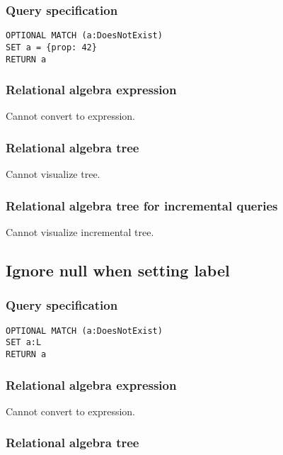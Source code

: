 \subsubsection*{Query specification}

\begin{lstlisting}
OPTIONAL MATCH (a:DoesNotExist)
SET a = {prop: 42}
RETURN a
\end{lstlisting}

\subsubsection*{Relational algebra expression}

Cannot convert to expression.

\subsubsection*{Relational algebra tree}

Cannot visualize tree.

\subsubsection*{Relational algebra tree for incremental queries}

Cannot visualize incremental tree.

\subsection{Ignore null when setting label}

\subsubsection*{Query specification}

\begin{lstlisting}
OPTIONAL MATCH (a:DoesNotExist)
SET a:L
RETURN a
\end{lstlisting}

\subsubsection*{Relational algebra expression}

Cannot convert to expression.

\subsubsection*{Relational algebra tree}

